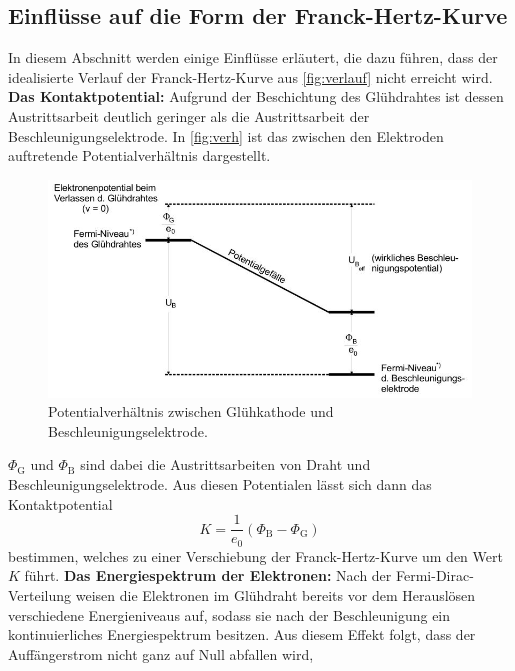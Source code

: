 \subsection{Einflüsse auf die Form der Franck-Hertz-Kurve}
In diesem Abschnitt werden einige Einflüsse erläutert, die dazu führen, dass der idealisierte Verlauf der Franck-Hertz-Kurve aus \autoref{fig:verlauf} nicht erreicht wird.
\newline
\textbf{Das Kontaktpotential:}\newline
Aufgrund der Beschichtung des Glühdrahtes ist dessen Austrittsarbeit deutlich geringer als die Austrittsarbeit der Beschleunigungselektrode. In \autoref{fig:verh} ist das zwischen den Elektroden auftretende Potentialverhältnis dargestellt.
\begin{figure}[H]
    \centering
    \includegraphics[width=\textwidth]{images/potential.JPG}
    \caption{Potentialverhältnis zwischen Glühkathode und Beschleunigungselektrode. \cite{V601}}
    \label{fig:verh}
  \end{figure}
\noindent
$\Phi_\text{G}$ und $\Phi_\text{B}$ sind dabei die Austrittsarbeiten von Draht und Beschleunigungselektrode. Aus diesen Potentialen lässt sich dann das Kontaktpotential
    \begin{equation*}
     K = \frac{1}{e_0} (\Phi_\text{B} - \Phi_\text{G}) 
    \end{equation*}
\noindent
bestimmen, welches zu einer Verschiebung der Franck-Hertz-Kurve um den Wert $K$ führt. \newline
\textbf{Das Energiespektrum der Elektronen:}\newline
Nach der Fermi-Dirac-Verteilung weisen die Elektronen im Glühdraht bereits vor dem Herauslösen verschiedene Energieniveaus auf, sodass sie nach der Beschleunigung ein kontinuierliches Energiespektrum besitzen. Aus diesem Effekt folgt, dass der Auffängerstrom nicht ganz auf Null abfallen wird,
